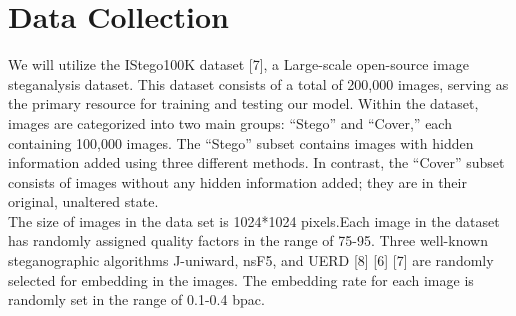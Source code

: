\section{Data Collection} 
We will utilize the IStego100K dataset [7], a Large-scale open-source image steganalysis dataset. This dataset consists of a total of 200,000 images, serving as the primary resource for training and testing our model. Within the dataset, images are categorized into two main groups: ``Stego'' and ``Cover,'' each containing 100,000 images. The ``Stego'' subset contains images with hidden information added using three different methods. In contrast, the ``Cover'' subset consists of images without any hidden information added; they are in their original, unaltered state.\\
The size of images in the data set is 1024*1024 pixels.Each image in the dataset has randomly assigned quality factors in the range of 75-95. Three well-known steganographic algorithms J-uniward, nsF5, and UERD [8] [6] [7] are randomly selected for embedding in the images. The embedding rate for each image is randomly set in the
range of 0.1-0.4 bpac.
